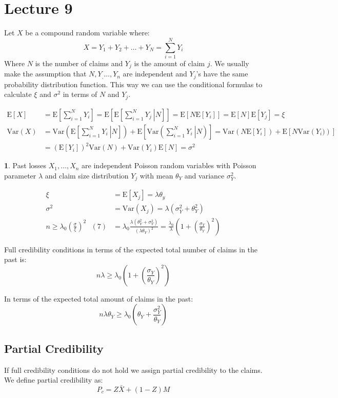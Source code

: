 \documentclass[english,12pt]{article}
\theoremstyle{plain}
\theoremstyle{definition}
\newtheorem*{example}{\protect\examplename}
\theoremstyle{definition} %
\providecommand{\examplename}{Example}
\newcommand{\ex}[1]{\mbox{E} \left[ #1 \right]}
\newcommand{\var}[1]{\mbox{Var} \left( #1 \right)}
\newcommand{\condex}[2]{\mbox{E} \left[ \left. #1 \ \right\vert \left. #2 \right. \right]}
\newcommand{\condvar}[2]{\mbox{Var} \left( \left. #1 \ \right\lvert \left. #2 \right. \right)}
\begin{document}
\section*{Lecture 9}
Let $X$ be a compound random variable where:
\[X=Y_1+Y_2+\ldots+Y_N=\sum\limits_{i=1}^NY_i\]
Where $N$ is the number of claims and $Y_j$ is the amount of claim $j$.  We usually make the assumption that $N,Y_,\ldots,Y_n$ are independent and $Y_j$'s have the same probability distribution function. This way we can use the conditional formulas to calculate $\xi$ and $\sigma^2$ in terms of $N$ and $Y_j$.

\begin{align*}
\ex{X}
&=\ex{\sum\limits_{i=1}^NY_i}
=\ex{\condex{\sum\limits_{i=1}^NY_j}{N}}
=\ex{N\ex{Y_i}}
=\ex{N}\ex{Y_j}
=\xi\\
\var{X}
&=\var{\condex{\sum\limits_{i=1}^NY_i}{N}}+\ex{\condvar{\sum\limits_{i=1}^NY_i}{N}}
=\var{N\ex{Y_i}}+\ex{N\var{Y_i)}}\\
&=(\ex{Y_i})^2\var{N}+\var{Y_i}\ex{N}=\sigma^2
\end{align*}

\begin{example}
Past losses $X_1,\ldots,X_n$ are independent Poisson random variables with Poisson parameter $\lambda$ and claim size distribution $Y_j$ with mean $\theta_Y$ and variance $\sigma_Y^2$.

\begin{align*}
\xi&=\ex{X_j}=\lambda\theta_y\\
\sigma^2&=\var{X_j}=\lambda(\sigma_Y^2+\theta_Y^2)\\
n\ge\lambda_0\left(\frac{\sigma}{\xi}\right)^2\text{ }(7)
&=\lambda_0\frac{\lambda(\theta_Y^2+\sigma_Y^2)}{(\lambda\theta_Y)^2}
=\frac{\lambda_0}{\lambda}\left(1+\left(\frac{\sigma_Y}{\theta_Y}\right)^2\right)
\end{align*}

Full credibility conditions in terms of the expected total number of claims in the past is:
\[n\lambda\ge\lambda_0\left(1+\left(\frac{\sigma_Y}{\theta_Y}\right)^2\right)\]

In terms of the expected total amount of claims in the past:
\[n\lambda\theta_Y\ge\lambda_0\left(\theta_Y+\frac{\sigma_Y^2}{\theta_Y}\right)\]
\end{example}

\subsection{Partial Credibility}
If full credibility conditions do not hold we assign partial credibility to the claims.  We define partial credibility as:
\[P_c=Z\bar{X}+(1-Z)M\]
\end{document}
